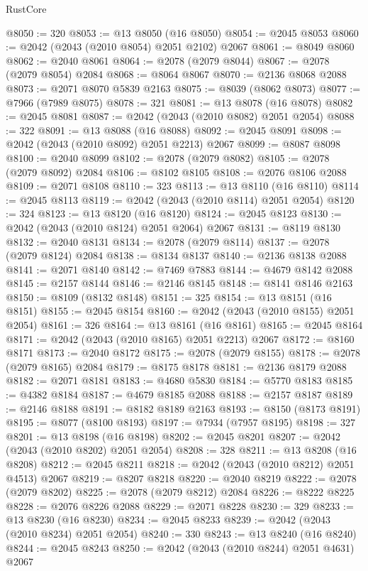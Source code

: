 \begin{lexlean}{RustCore}
\begin{coremodule}
@8050 := 320
@8053 := @13 @8050 (@16 @8050)
@8054 := @2045 @8053
@8060 := @2042 (@2043 (@2010 @8054) @2051 @2102) @2067
@8061 := @8049 @8060
@8062 := @2040 @8061
@8064 := @2078 (@2079 @8044)
@8067 := @2078 (@2079 @8054) @2084
@8068 := @8064 @8067
@8070 := @2136 @8068 @2088
@8073 := @2071 @8070 @5839 @2163
@8075 := @8039 (@8062 @8073)
@8077 := @7966 (@7989 @8075)
@8078 := 321
@8081 := @13 @8078 (@16 @8078)
@8082 := @2045 @8081
@8087 := @2042 (@2043 (@2010 @8082) @2051 @2054)
@8088 := 322
@8091 := @13 @8088 (@16 @8088)
@8092 := @2045 @8091
@8098 := @2042 (@2043 (@2010 @8092) @2051 @2213) @2067
@8099 := @8087 @8098
@8100 := @2040 @8099
@8102 := @2078 (@2079 @8082)
@8105 := @2078 (@2079 @8092) @2084
@8106 := @8102 @8105
@8108 := @2076 @8106 @2088
@8109 := @2071 @8108
@8110 := 323
@8113 := @13 @8110 (@16 @8110)
@8114 := @2045 @8113
@8119 := @2042 (@2043 (@2010 @8114) @2051 @2054)
@8120 := 324
@8123 := @13 @8120 (@16 @8120)
@8124 := @2045 @8123
@8130 := @2042 (@2043 (@2010 @8124) @2051 @2064) @2067
@8131 := @8119 @8130
@8132 := @2040 @8131
@8134 := @2078 (@2079 @8114)
@8137 := @2078 (@2079 @8124) @2084
@8138 := @8134 @8137
@8140 := @2136 @8138 @2088
@8141 := @2071 @8140
@8142 := @7469 @7883
@8144 := @4679 @8142 @2088
@8145 := @2157 @8144
@8146 := @2146 @8145
@8148 := @8141 @8146 @2163
@8150 := @8109 (@8132 @8148)
@8151 := 325
@8154 := @13 @8151 (@16 @8151)
@8155 := @2045 @8154
@8160 := @2042 (@2043 (@2010 @8155) @2051 @2054)
@8161 := 326
@8164 := @13 @8161 (@16 @8161)
@8165 := @2045 @8164
@8171 := @2042 (@2043 (@2010 @8165) @2051 @2213) @2067
@8172 := @8160 @8171
@8173 := @2040 @8172
@8175 := @2078 (@2079 @8155)
@8178 := @2078 (@2079 @8165) @2084
@8179 := @8175 @8178
@8181 := @2136 @8179 @2088
@8182 := @2071 @8181
@8183 := @4680 @5830
@8184 := @5770 @8183
@8185 := @4382 @8184
@8187 := @4679 @8185 @2088
@8188 := @2157 @8187
@8189 := @2146 @8188
@8191 := @8182 @8189 @2163
@8193 := @8150 (@8173 @8191)
@8195 := @8077 (@8100 @8193)
@8197 := @7934 (@7957 @8195)
@8198 := 327
@8201 := @13 @8198 (@16 @8198)
@8202 := @2045 @8201
@8207 := @2042 (@2043 (@2010 @8202) @2051 @2054)
@8208 := 328
@8211 := @13 @8208 (@16 @8208)
@8212 := @2045 @8211
@8218 := @2042 (@2043 (@2010 @8212) @2051 @4513) @2067
@8219 := @8207 @8218
@8220 := @2040 @8219
@8222 := @2078 (@2079 @8202)
@8225 := @2078 (@2079 @8212) @2084
@8226 := @8222 @8225
@8228 := @2076 @8226 @2088
@8229 := @2071 @8228
@8230 := 329
@8233 := @13 @8230 (@16 @8230)
@8234 := @2045 @8233
@8239 := @2042 (@2043 (@2010 @8234) @2051 @2054)
@8240 := 330
@8243 := @13 @8240 (@16 @8240)
@8244 := @2045 @8243
@8250 := @2042 (@2043 (@2010 @8244) @2051 @4631) @2067

\end{coremodule}
\end{lexlean}
